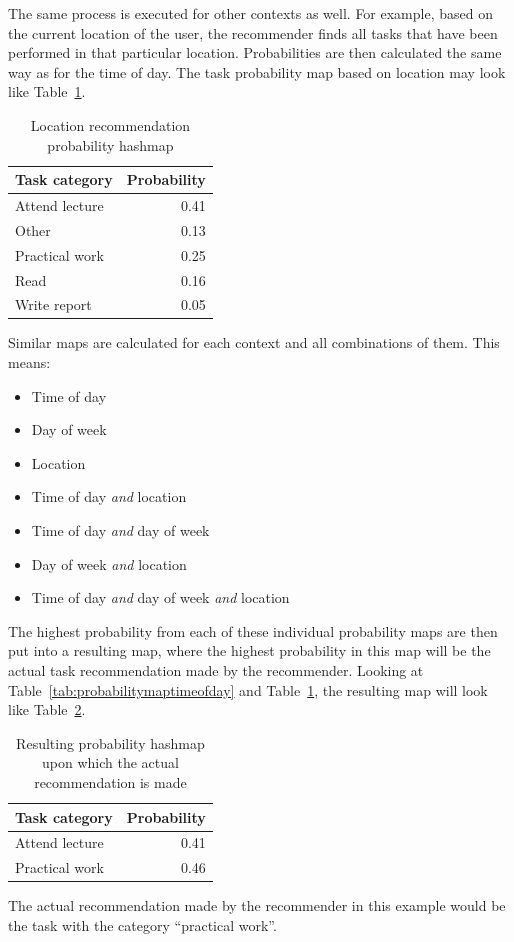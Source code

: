 The same process is executed for other contexts as well. For example, based on the current location of the user, the recommender finds all tasks that have been performed in that particular location. Probabilities are then calculated the same way as for the time of day. The task probability map based on location may look like Table~\ref{tab:probabilitymaplocation}.
\begin{table}[tbp]
  \centering
  \begin{tabular}{|l|r|}
	\hline
	\textbf{Task category} & \textbf{Probability} \\
	\hline
	Attend lecture & 0.41 \\
	\hline
	Other & 0.13 \\
	\hline
	Practical work & 0.25 \\
	\hline
	Read & 0.16 \\
	\hline
	Write report & 0.05 \\
	\hline
  \end{tabular}
  \caption{Location recommendation probability hashmap}
  \label{tab:probabilitymaplocation}
\end{table}

Similar maps are calculated for each context and all combinations of them. This means:
\begin{itemize}
	\item Time of day
	\item Day of week
	\item Location
	\item Time of day \emph{and} location
	\item Time of day \emph{and} day of week
	\item Day of week \emph{and} location
	\item Time of day \emph{and} day of week \emph{and} location
\end{itemize}
The highest probability from each of these individual probability maps are then put into a resulting map, where the highest probability in this map will be the actual task recommendation made by the recommender. Looking at Table~\ref{tab:probabilitymaptimeofday} and Table~\ref{tab:probabilitymaplocation}, the resulting map will look like Table~\ref{tab:probabilitymapresult}.
\begin{table}[tbp]
  \centering
  \begin{tabular}{|l|r|}
	\hline
	\textbf{Task category} & \textbf{Probability} \\
	\hline
	Attend lecture & 0.41 \\
	\hline
	Practical work & 0.46 \\
	\hline
  \end{tabular}
  \caption{Resulting probability hashmap upon which the actual recommendation is made}
  \label{tab:probabilitymapresult}
\end{table}
The actual recommendation made by the recommender in this example would be the task with the category ``practical work''.

